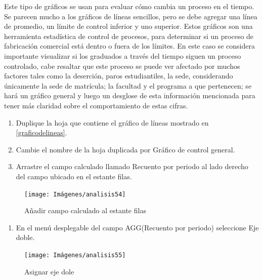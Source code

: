 \documentclass[
]{book}
\providecommand{\tightlist}{%
  \setlength{\itemsep}{0pt}\setlength{\parskip}{0pt}}
\begin{document}
Este tipo de gráficos se usan para evaluar cómo cambia un proceso en el tiempo. Se parecen mucho a los gráficos de líneas sencillos, pero se debe agregar una línea de promedio, un límite de control inferior y uno superior. Estos gráficos son una herramienta estadística de control de procesos, para determinar si un proceso de fabricación comercial está dentro o fuera de los límites.
En este caso se considera importante visualizar si los graduados a través del tiempo siguen un proceso controlado, cabe resaltar que este proceso se puede ver afectado por muchos factores tales como la deserción, paros estudiantiles, la sede, considerando únicamente la sede de matrícula; la facultad y el programa a que pertenecen; se hará un gráfico general y luego un desglose de esta información mencionada para tener más claridad sobre el comportamiento de estas cifras.

\begin{enumerate}
\def\labelenumi{\arabic{enumi}.}
\item
  Duplique la hoja que contiene el gráfico de líneas mostrado en \ref{graficodelineas}.
\item
  Cambie el nombre de la hoja duplicada por Gráfico de control general.
\item
  Arrastre el campo calculado llamado Recuento por periodo al lado derecho del campo ubicado en el estante filas.
\end{enumerate}

\begin{figure}

{\centering \texttt{[image: Imágenes/analisis54]} 

}

\caption{Añadir campo calculado al estante filas}\label{fig:paso3graficodecontrol-fig}
\end{figure}

\begin{enumerate}
\def\labelenumi{\arabic{enumi}.}
\setcounter{enumi}{3}
\tightlist
\item
  En el menú desplegable del campo AGG(Recuento por periodo) seleccione Eje doble.
\end{enumerate}

\begin{figure}

{\centering \texttt{[image: Imágenes/analisis55]} 

}

\caption{Asignar eje dole}\label{fig:paso4graficodecontrol-fig}
\end{figure}
\end{document}
